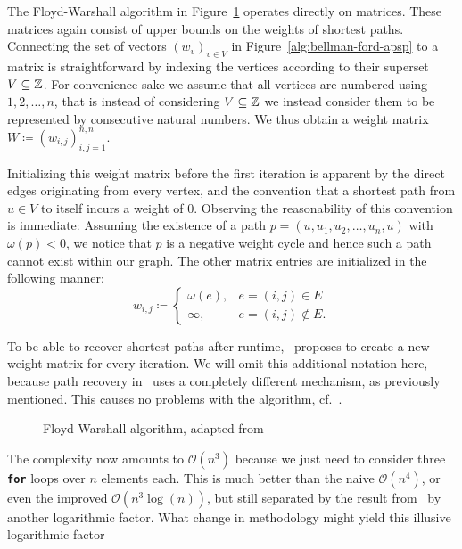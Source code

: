 The Floyd-Warshall algorithm in Figure~\ref{alg:floyd-warshall} operates directly on matrices.
These matrices again consist of upper bounds on the weights of shortest paths.
Connecting the set of vectors ${(w_v)}_{v \in V}$ in Figure~\ref{alg:bellman-ford-apsp} to a matrix is straightforward by indexing the vertices according to their superset $V \subseteq \mathbb{Z}$.
For convenience sake we assume that all vertices are numbered using $1, 2, \dots, n$, that is instead of considering $V \subseteq \mathbb{Z}$ we instead consider them to be represented by consecutive natural numbers.
We thus obtain a weight matrix $W \coloneqq {(w_{i, j})}_{i, j = 1}^{n, n}$.

Initializing this weight matrix before the first iteration is apparent by the direct edges originating from every vertex, and the convention that a shortest path from $u \in V$ to itself incurs a weight of $0$.
Observing the reasonability of this convention is immediate: Assuming the existence of a path $p = (u, u_1, u_2, \dots, u_n, u)$ with $\omega(p) < 0$, we notice that $p$ is a negative weight cycle and hence such a path cannot exist within our graph.
The other matrix entries are initialized in the following manner:
\[
    w_{i, j} \coloneqq \begin{cases}
        \omega(e), & e = (i, j) \in E \\
        \infty, & e = (i, j) \not\in E.
    \end{cases}
\]

To be able to recover shortest paths after runtime,\ \cite[Chapter~25]{Cormen2001} proposes to create a new weight matrix for every iteration.
We will omit this additional notation here, because path recovery in~\cite{Chan2007} uses a completely different mechanism, as previously mentioned.
This causes no problems with the algorithm, cf.~\cite[Exercise~25.4-5]{Cormen2001}.

\begin{figure}[ht]
    \centering
    \begin{minipage}{.6\textwidth}
        \begin{algorithm}[H]
        \end{algorithm}
    \end{minipage}
    \caption{Floyd-Warshall algorithm, adapted from~\cite[Chapter~25]{Cormen2001}}\label{alg:floyd-warshall}
\end{figure}

The complexity now amounts to $\mathcal{O}\left( n^3 \right)$ because we just need to consider three \textbf{\texttt{for}} loops over $n$ elements each.
This is much better than the naive $\mathcal{O}\left( n^4 \right)$, or even the improved $\mathcal{O}\left( n^3 \log(n) \right)$, but still separated by the result from~\cite{Chan2007} by another logarithmic factor.
What change in methodology might yield this illusive logarithmic factor\textinterrobang{}
